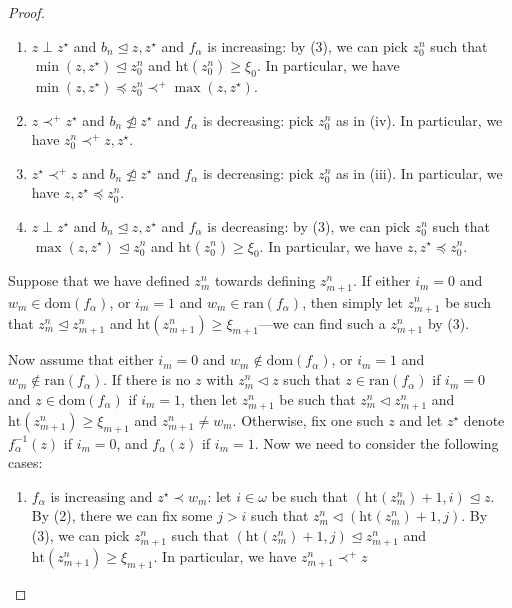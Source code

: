 \documentclass[12pt]{amsart}
\theoremstyle{definition}
\theoremstyle{remark}
\begin{document}
\begin{proof}
\begin{enumerate}[label={(\roman*)}]
\item $z \perp z^\star$ and $b_n \unlhd z, z^\star$ and $f_\alpha$ is increasing:
\newline by (3), we can pick $z_0^n$ such that $\min (z,z^\star) \unlhd z_0^n$ and $\mathrm{ht}(z_0^n) \ge \xi_0$. In particular, we have $\min (z,z^\star) \preceq z_0^n \prec^+ \max (z,z^\star)$.


\item $z \prec^+ z^\star$ and $b_n \not\trianglelefteq z^\star$ and $f_\alpha$ is decreasing:
\newline pick $z_0^n$ as in (iv). In particular, we have $z_0^n \prec^+ z,z^\star$.


\item $z^\star \prec^+ z$ and $b_n \not\trianglelefteq z^\star$ and $f_\alpha$ is decreasing:
\newline pick $z_0^n$ as in (iii). In particular, we have $z,z^\star \preceq z_0^n$.


\item $z \perp z^\star$ and $b_n \unlhd z, z^\star$ and $f_\alpha$ is decreasing:
\newline by (3), we can pick $z_0^n$ such that $\max (z,z^\star) \unlhd z_0^n$ and $\mathrm{ht}(z_0^n) \ge \xi_0$. In particular, we have $z,z^\star \preceq z_0^n$.
\end{enumerate}




Suppose that we have defined $z_m^n$ towards defining $z_{m+1}^n$. If either $i_m = 0$ and $w_m \in \mathrm{dom}(f_\alpha)$, or $i_m = 1$ and $w_m \in \mathrm{ran}(f_\alpha)$, then simply let $z_{m+1}^n$ be such that $z_{m}^n \unlhd z_{m+1}^n$ and $\mathrm{ht}(z_{m+1}^n) \ge \xi_{m+1}$---we can find such a $z_{m+1}^n$ by (3). 

Now assume that either $i_m = 0$ and $w_m \not\in \mathrm{dom}(f_\alpha)$, or $i_m = 1$ and $w_m \not\in \mathrm{ran}(f_\alpha)$. If there is no $z$ with $z_m^n \lhd z$ such that $z \in \mathrm{ran}(f_\alpha)$ if $i_m = 0$ and $z \in \mathrm{dom}(f_\alpha)$ if $i_m = 1$, then let $z_{m+1}^n$ be such that $z_m^n \lhd z_{m+1}^n$ and $\mathrm{ht}(z_{m+1}^n) \ge \xi_{m+1}$ and $z_{m+1}^n \neq w_m$. Otherwise, fix one such $z$ and let $z^\star$ denote $f^{-1}_\alpha(z)$ if $i_m  = 0$, and $f_\alpha(z)$ if $i_m = 1$. Now we need to consider the following cases:
\begin{enumerate}[label={(\alph*)}]
\itemsep0.3em
\item $f_\alpha$ is increasing and $z^\star \prec w_m$:
\newline let $i \in \omega$ be such that $(\mathrm{ht}(z_m^n)+1, i) \unlhd z$. By (2), there we can fix some $j > i$ such that $z_m^n \lhd (\mathrm{ht}(z_m^n)+1, j)$. By (3), we can pick $z_{m+1}^n$ such that $(\mathrm{ht}(z_m^n)+1, j) \unlhd z_{m+1}^n$ and $\mathrm{ht}(z_{m+1}^n) \ge \xi_{m+1}$. In particular, we have $z_{m+1}^n \prec^+ z$



\end{enumerate}
\end{proof}
\end{document}
